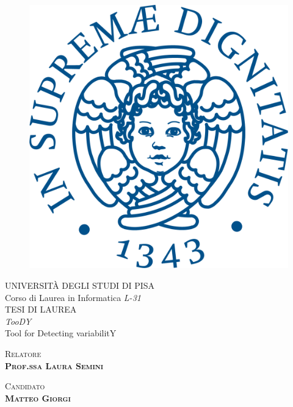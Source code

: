 \documentclass[12pt]{report}
\newcommand{\toody}{\textsl{TooDY}\xspace}
\begin{document}
\fontsize{13}{18}\selectfont


\begin{titlepage}
\begin{figure}
\centering\includegraphics[scale=0.5]{cherubino.png}
\vspace{0.5cm}
\end{figure}
\begin{center}
{\large{UNIVERSITÀ DEGLI STUDI DI PISA}}\\
\vspace{0.5cm}
{\LARGE{Corso di Laurea in Informatica \textsl{L-31}}}\\
\vspace{2cm}
{\Large{TESI DI LAUREA}}\\
\vspace{2cm}
{\huge{\toody\\{\normalsize Tool for Detecting variabilitY}}}
\end{center}
\vspace{2cm}
\begin{minipage}[t]{0.49\textwidth}\centering
{\large{\scshape{Relatore}\\\bf{Prof.ssa Laura Semini}}}
\end{minipage}
\hfill
\begin{minipage}[t]{0.49\textwidth}\centering
{\large{\scshape{Candidato}\\\bf{Matteo Giorgi}}}
\vspace{4cm}
\end{minipage}
\end{titlepage}
\end{document}

